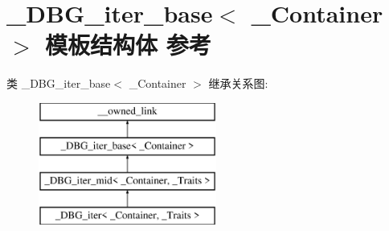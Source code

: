 \hypertarget{struct___d_b_g__iter__base}{}\section{\+\_\+\+D\+B\+G\+\_\+iter\+\_\+base$<$ \+\_\+\+Container $>$ 模板结构体 参考}
\label{struct___d_b_g__iter__base}
类 \+\_\+\+D\+B\+G\+\_\+iter\+\_\+base$<$ \+\_\+\+Container $>$ 继承关系图\+:\begin{figure}[H]
\begin{center}
\leavevmode
\includegraphics[height=4.000000cm]{struct___d_b_g__iter__base}
\end{center}
\end{figure}

